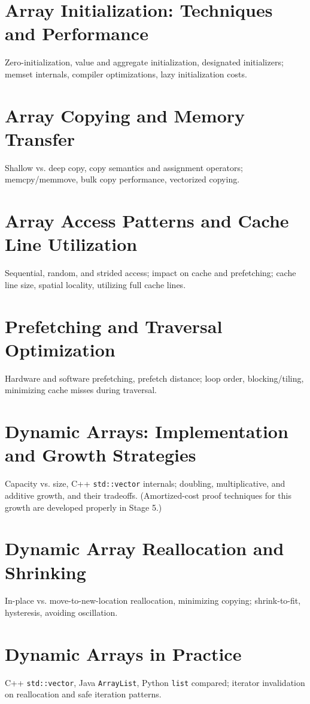 \chapter{Array Initialization: Techniques and Performance}
Zero-initialization, value and aggregate initialization, designated initializers; memset internals, compiler optimizations, lazy initialization costs.

\chapter{Array Copying and Memory Transfer}
Shallow vs. deep copy, copy semantics and assignment operators; memcpy/memmove, bulk copy performance, vectorized copying.

\chapter{Array Access Patterns and Cache Line Utilization}
Sequential, random, and strided access; impact on cache and prefetching; cache line size, spatial locality, utilizing full cache lines.

\chapter{Prefetching and Traversal Optimization}
Hardware and software prefetching, prefetch distance; loop order, blocking/tiling, minimizing cache misses during traversal.

\chapter{Dynamic Arrays: Implementation and Growth Strategies}
Capacity vs. size, C++ \texttt{std::vector} internals; doubling, multiplicative, and additive growth, and their tradeoffs. (Amortized-cost proof techniques for this growth are developed properly in Stage 5.)

\chapter{Dynamic Array Reallocation and Shrinking}
In-place vs. move-to-new-location reallocation, minimizing copying; shrink-to-fit, hysteresis, avoiding oscillation.

\chapter{Dynamic Arrays in Practice}
C++ \texttt{std::vector}, Java \texttt{ArrayList}, Python \texttt{list} compared; iterator invalidation on reallocation and safe iteration patterns.

